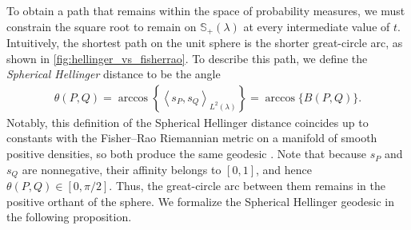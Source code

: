 \documentclass[11pt,twoside]{article}
\theoremstyle{definition}
\theoremstyle{remark}
\begin{document}
To obtain a path that remains within the space of probability measures, we must constrain the square root to remain on $\mathbb{S}_+(\lambda)$ at every intermediate value of $t$. Intuitively, the shortest path on the unit sphere is the shorter great-circle arc, as shown in \cref{fig:hellinger_vs_fisherrao}. To describe this path, we define the \textit{Spherical Hellinger} distance to be the angle
\begin{align} \label{theta_definition}
    \theta(P,Q) = \arccos \left\{ \left\langle s_P,s_Q\right\rangle_{L^2(\lambda)} \right\} = \arccos\{B(P,Q)\}.
\end{align}
Notably, this definition of the Spherical Hellinger distance coincides up to constants with the Fisher--Rao Riemannian metric on a manifold of smooth positive densities, so both  produce the same geodesic \citep{Srivastava2007riemannian, kurtek2015}. Note that because $s_P$ and $s_Q$ are nonnegative, their affinity belongs to $[0,1]$, and hence $\theta(P,Q)\in[0,\pi/2]$. Thus, the great-circle arc between them remains in the positive orthant of the sphere. We formalize the Spherical Hellinger geodesic in the following proposition.
\end{document}
